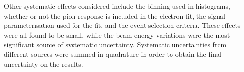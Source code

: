 %
%




Other systematic effects considered include the binning used in histograms, whether or not the pion response is included in the electron fit, the signal parameterisation used for the fit, and the event selection criteria. These effects were all found to be small, while the beam energy variations were the most significant source of systematic uncertainty. Systematic uncertainties from different sources were summed in quadrature in order to obtain the final uncertainty on the results. 


